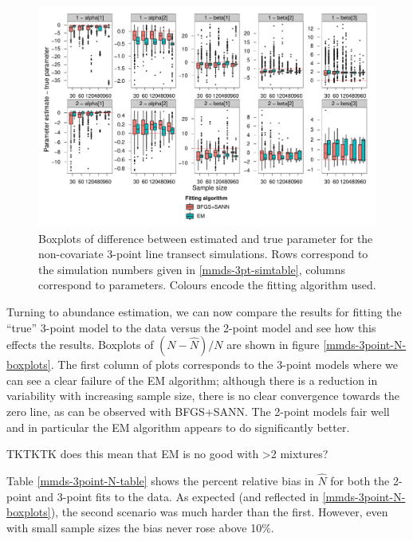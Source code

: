 \begin{figure}
\centering
\includegraphics[width=7in]{mix/figs/3point-boxplots.pdf}
\caption{Boxplots of difference between estimated and true parameter for the non-covariate 3-point line transect simulations. Rows correspond to the simulation numbers given in \ref{mmds-3pt-simtable}, columns correspond to parameters. Colours encode the fitting algorithm used.}
\label{mmds-3point-boxplots}
\end{figure}

Turning to abundance estimation, we can now compare the results for fitting the ``true'' 3-point model to the data versus the 2-point model and see how this effects the results. Boxplots of $(N-\hat{N})/N$ are shown in figure \ref{mmds-3point-N-boxplots}. The first column of plots corresponds to the 3-point models where we can see a clear failure of the EM algorithm; although there is a reduction in variability with increasing sample size, there is no clear convergence towards the zero line, as can be observed with BFGS+SANN. The 2-point models fair well and in particular the EM algorithm appears to do significantly better. 

TKTKTK does this mean that EM is no good with >2 mixtures?

Table \ref{mmds-3point-N-table} shows the percent relative bias in $\hat{N}$ for both the 2-point and 3-point fits to the data. As expected (and reflected in \ref{mmds-3point-N-boxplots}), the second scenario was much harder than the first. However, even with small sample sizes the bias never rose above 10\%.



